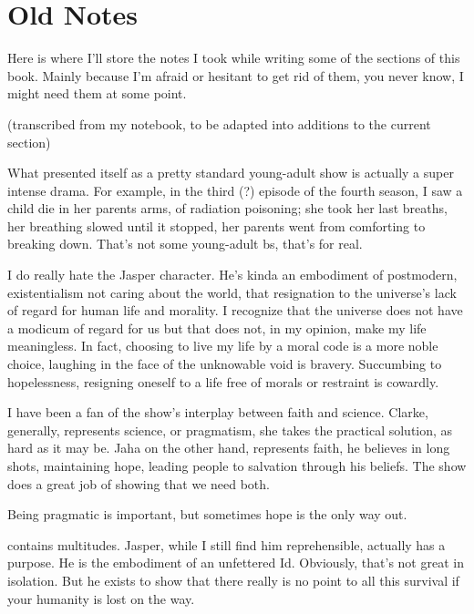 \documentclass[../butidigress.tex]{subfiles}
\begin{document}
\chapter{Old Notes}\label{chap:oldnotes}
\newpage

Here is where I'll store the notes I took while writing some of the sections of this book.
Mainly because I'm afraid or hesitant to get rid of them, you never know, I might need them at some point.

\begin{somenotes}{}
    \item (transcribed from my notebook, to be adapted into additions to the current section)
    \item What presented itself as a pretty standard young-adult show is actually a super intense drama. For example, in the third (?) episode of the fourth season, I saw a child die in her parents arms, of radiation poisoning; she took her last breaths, her breathing slowed until it stopped, her parents went from comforting to breaking down. That's not some young-adult bs, that's for real. \par I do really hate the Jasper character. He's kinda an embodiment of postmodern, existentialism not caring about the world, that resignation to the universe's lack of regard for human life and morality. I recognize that the universe does not have a modicum of regard for us but that does not, in my opinion, make my life meaningless. In fact, choosing to live my life by a moral code is a more noble choice, laughing in the face of the unknowable void is bravery. Succumbing to hopelessness, resigning oneself to a life free of morals or restraint is cowardly.\par I have been a fan of the show's interplay between faith and science. Clarke, generally, represents science, or pragmatism, she takes the practical solution, as hard as it may be. Jaha on the other hand, represents faith, he believes in long shots, maintaining hope, leading people to salvation through his beliefs. The show does a great job of showing that we need both.\par Being pragmatic is important, but sometimes hope is the only way out.
    \item {} contains multitudes. Jasper, while I still find him reprehensible, actually has a purpose. He is the embodiment of an unfettered Id. Obviously, that's not great in isolation. But he exists to show that there really is no point to all this survival if your humanity is lost on the way.

\end{somenotes}
\end{document}
